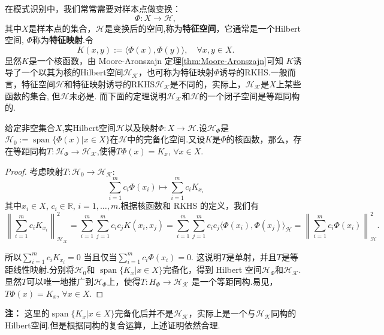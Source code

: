 \documentclass[../master.tex]{subfiles}
\begin{document}
在模式识别中，我们常常需要对样本点做变换：
\begin{equation}\label{def:特征映射}
    \Phi:X\to \mathcal{H},
\end{equation}
其中$X$是样本点的集合，$\mathcal{H}$是变换后的空间,称为\textbf{特征空间}，它通常是一个Hilbert空间, $\Phi$称为\textbf{特征映射}.令
\begin{equation*}
    K(x,y):=\langle \Phi(x),\Phi(y)\rangle,\quad\forall x,y\in X.
\end{equation*}
显然$K$是一个核函数，由 Moore-Aronszajn 定理\ref{thm:Moore-Aronszajn}可知 $K$诱导了一个以其为核的Hilbert空间$\mathcal{H_K}$，也可称为特征映射$\Phi$诱导的RKHS.一般而言，特征空间$\mathcal{H}$和特征映射诱导的RKHS$\mathcal{H_K}$是不同的，实际上，$\mathcal{H_K}$是$X$上某些函数的集合, 但$\mathcal{H}$未必是. 而下面的定理说明$\mathcal{H_K}$和$\mathcal{H}$的一个闭子空间是等距同构的.

\begin{theorem}[特征映射诱导的RKHS等距嵌入特征空间]
    给定非空集合$X$,实Hilbert空间$\mathcal{H}$以及映射$\Phi:X\to \mathcal{H}.$设$\mathcal{H}_{\Phi}$是$\mathcal{H}_{0}:=\operatorname{span}\{\Phi(x)|x\in X\}$在$\mathcal{H}$中的完备化空间.又设$K$是$\Phi$的核函数，那么，存在等距同构$T:\mathcal{H}_\Phi\to\mathcal{H_K}$,使得$T\Phi ( x) = K_x$, $\forall x\in X.$
\end{theorem}

\begin{proof}
    考虑映射$T:\mathcal{H}_0\to\mathcal{H_K}$:
    \begin{equation*}
        \sum_{i=1}^m c_i\Phi(x_i)\mapsto\sum_{i=1}^mc_iK_{x_i}
    \end{equation*}
    其中$x_i\in X$, $c_i\in \mathbb{R}$, $i= 1, \dots , m.$根据核函数和 RKHS 的定义，我们有
$$\left\|\sum_{i=1}^{m}c_{i}K_{x_{i}}\right\|_{\mathcal{H_K}}^{2}=\sum_{i=1}^{m}\sum_{j=1}^{m}c_{i}c_{j}K(x_{i},x_{j})=\sum_{i=1}^{m}\sum_{j=1}^{m}c_{i}c_{j}\langle\Phi(x_{i}),\Phi(x_{j})\rangle_{\mathcal{H}}=\left\|\sum_{i=1}^{m}c_{i}\Phi(x_{i})\right\|_{\mathcal{H}}^{2}.$$

所以$\sum_{i=1}^{m}c_{i}K_{x_{i}}=0$ 当且仅当$\sum_{i=1}^{m}c_{i}\Phi(x_{i})=0.$ 这说明$T$是单射，并且$T$是等距线性映射.分别将$\mathcal{H}_0$和 $\operatorname{span}\{K_x|x\in X\}$完备化，得到 Hilbert 空间$\mathcal{H}_\Phi$和$\mathcal{H_K}.$显然$T$可以唯一地推广到$\mathcal{H}_\Phi$上，使得$T:H_\Phi\to\mathcal{H_K}$ 是一个等距同构.易见，$T\Phi ( x) = K_x$, $\forall x\in X.$

\end{proof}
\textbf{注：} 这里的$\operatorname{span}\{K_x|x\in X\}$完备化后并不是$\mathcal{H_K}$，实际上是一个与$\mathcal{H_K}$同构的Hilbert空间.但是根据同构的复合运算，上述证明依然合理.
\end{document}
